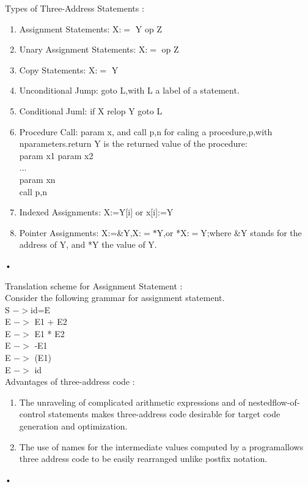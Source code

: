 \documentclass[11pt]{article}
\begin{document}
	\noindent
	Types of Three-Address Statements :\\
	\begin{enumerate}
		\item Assignment Statements: X:$=$ Y op Z
		\item Unary Assignment Statements: X:$=$ op Z
		\item Copy Statements: X:$=$ Y
		\item Unconditional Jump: goto L,with L a label of a statement.
		\item Conditional Juml: if X relop Y goto L
		\item Procedure Call: param x, and call p,n for caling a procedure,p,with nparameters.return Y is the returned value of the procedure:\\
		param x1 param x2\\
		$...$\\
		param xn\\
		call p,n\\
		\item Indexed Assignments: X:=Y[i] or x[i]:=Y
		\item Pointer Assignments: X:=\&Y,X:$=*$Y,or *X:$=$Y;where \&Y stands for the address of Y, and *Y the value of Y.
		
	\end{enumerate}•
	
	\noindent
	Translation scheme for Assignment Statement :\\
	Consider the following grammar for assignment statement.\\
	S $-> $id=E\\
	E $->$ E1 + E2\\
	E $->$ E1 * E2\\
	E $->$ -E1\\
	E $->$ (E1)\\
	E $->$ id\\
	
	\noindent
	Advantages of three-address code :\\
	\begin{enumerate}
		\item The unraveling of complicated arithmetic expressions and of nestedflow-of-control statements makes three-address code desirable for target code generation and optimization.
		\item The use of names for the intermediate values computed by a programallows three address code to be easily rearranged unlike postfix notation.
	\end{enumerate}•
	
\end{document}
